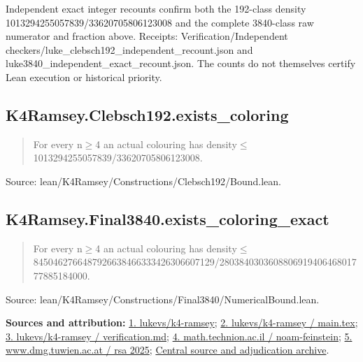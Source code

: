 \documentclass[11pt,a4paper]{article}
\begin{document}
{\small Independent exact integer recounts confirm both the 192-class density 1013294255057839/33620705806123008 and the complete 3840-class raw numerator and fraction above. Receipts: Verification/Independent checkers/luke\_clebsch192\_independent\_recount.json and luke3840\_independent\_exact\_recount.json. The counts do not themselves certify Lean execution or historical priority.\par}

\begin{samepage}
\subsection{K4Ramsey.Clebsch192.exists\_coloring}
\begin{quote}\small\ttfamily For every n\ensuremath{\geq}4 an actual colouring has density\ensuremath{\leq}1013294255057839/33620705806123008.\end{quote}
{\small Source: lean/K4Ramsey/Constructions/Clebsch192/Bound.lean.\par}

\end{samepage}
\begin{samepage}
\subsection{K4Ramsey.Final3840.exists\_coloring\_exact}
\begin{quote}\small\ttfamily For every n\ensuremath{\geq}4 an actual colouring has density\ensuremath{\leq}8450462766487926638466333426306607129/280384030360880691940646801777885184000.\end{quote}
{\small Source: lean/K4Ramsey/Constructions/Final3840/NumericalBound.lean.\par}

{\small\textbf{Sources and attribution:} \href{https://github.com/lukevs/k4-ramsey/tree/2cf216ba885fbb1b2d1b2d4920efeaa6ba438842}{1. lukevs/k4-ramsey}; \href{https://github.com/lukevs/k4-ramsey/blob/2cf216ba885fbb1b2d1b2d4920efeaa6ba438842/paper/main.tex}{2. lukevs/k4-ramsey / main.tex}; \href{https://github.com/lukevs/k4-ramsey/blob/2cf216ba885fbb1b2d1b2d4920efeaa6ba438842/docs/verification.md}{3. lukevs/k4-ramsey / verification.md}; \href{https://math.technion.ac.il/events/noam-feinstein/}{4. math.technion.ac.il / noam-feinstein}; \href{https://www.dmg.tuwien.ac.at/rsa2025/}{5. www.dmg.tuwien.ac.at / rsa 2025}; \href{https://github.com/alejandrozu/openmath-2026-judging}{Central source and adjudication archive}.\par}

\end{samepage}
\end{document}
